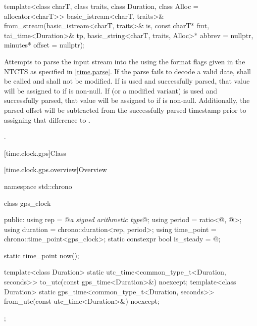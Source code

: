 %
\begin{itemdecl}
template<class charT, class traits, class Duration, class Alloc = allocator<charT>>
  basic_istream<charT, traits>&
    from_stream(basic_istream<charT, traits>& is, const charT* fmt,
                tai_time<Duration>& tp, basic_string<charT, traits, Alloc>* abbrev = nullptr,
                minutes* offset = nullptr);
\end{itemdecl}

\begin{itemdescr}
\pnum
\effects
Attempts to parse the input stream 
into the   using
the format flags given in the NTCTS 
as specified in \ref{time.parse}.
If the parse fails to decode a valid date,
 shall be called
and  shall not be modified.
If  is used and successfully parsed,
that value will be assigned to  if  is non-null.
If  (or a modified variant) is used and successfully parsed,
that value will be assigned to  if  is non-null.
Additionally, the parsed offset will be subtracted from
the successfully parsed timestamp prior to assigning that difference to .

\pnum
\returns {}.
\end{itemdescr}

[time.clock.gps]{Class }

[time.clock.gps.overview]{Overview}
%

\begin{codeblock}
namespace std::chrono {
  class gps_clock {
  public:
    using rep                       = @\textit{a signed arithmetic type}@;
    using period                    = ratio<@\unspecnc@, @\unspec@>;
    using duration                  = chrono::duration<rep, period>;
    using time_point                = chrono::time_point<gps_clock>;
    static constexpr bool is_steady = @\unspec@;

    static time_point now();

    template<class Duration>
      static utc_time<common_type_t<Duration, seconds>>
        to_utc(const gps_time<Duration>&) noexcept;
    template<class Duration>
      static gps_time<common_type_t<Duration, seconds>>
        from_utc(const utc_time<Duration>&) noexcept;
  };
}
\end{codeblock}

